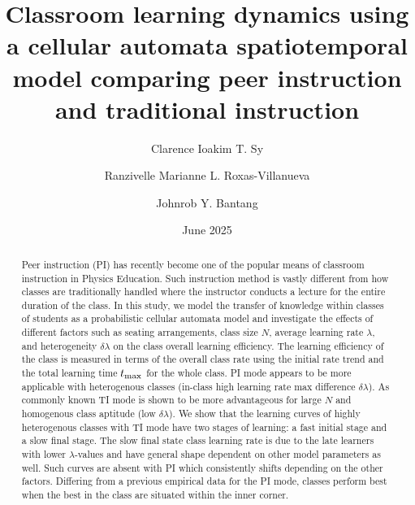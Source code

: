 \documentclass[twocolumn,secnumarabic,amssymb, nobibnotes, aps, prd]{revtex4-2}
\begin{document}
\title{Classroom learning dynamics using a cellular automata spatiotemporal model comparing peer instruction and traditional instruction}%

\author{Clarence Ioakim T. Sy}%
%

\author{Ranzivelle Marianne L. Roxas-Villanueva}%
%

\author{Johnrob Y. Bantang}%
%

\date{June 2025}%

\begin{abstract}
    Peer instruction (PI) has recently become one of the popular means of classroom instruction in Physics Education.
    Such instruction method is vastly different from how classes are traditionally handled where the instructor conducts a lecture for the entire duration of the class.
    In this study, we model the transfer of knowledge within classes of students as a probabilistic cellular automata model 
    and investigate the effects of different factors such as seating arrangements, class size $N$, average learning rate ${\lambda}$, and heterogeneity $\delta{\lambda}$ on the class overall learning efficiency.
    The learning efficiency of the class is measured in terms of the overall class rate using the initial rate trend and the total learning time $t_{\rm max}$ for the whole class.
    PI mode appears to be more applicable with heterogenous classes (in-class high learning rate max difference $\delta{\lambda}$).
    As commonly known TI mode is shown to be more advantageous for large $N$ and homogenous class aptitude (low $\delta{\lambda}$).
    We show that the learning curves of highly heterogenous classes with TI mode have two stages of learning: a fast initial stage and a slow final stage.
    The slow final state class learning rate is due to the late learners with lower $\lambda$-values and have general shape dependent on other model parameters as well.
    Such curves are absent with PI which consistently shifts depending on the other factors.
    Differing from a previous empirical data for the PI mode, classes perform best when the best in the class are situated within the inner corner.

\end{abstract}
\end{document}
